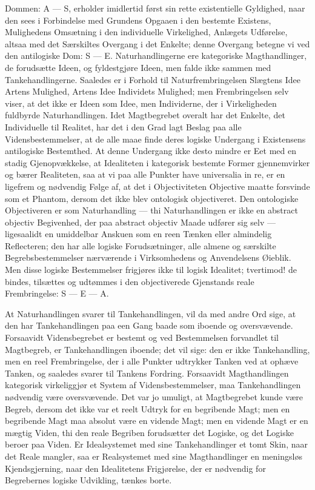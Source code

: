 \documentclass[12pt]{book}
\newcommand{\opage}[1]{\marginnote{\footnotesize\textit{[#1]}}}
\begin{document}
Dommen: A --- S, erholder imidlertid først sin rette existentielle Gyldighed, naar den sees i
Forbindelse med Grundens Opgaaen i den bestemte Existens, Mulighedens
\opage{222} Omsætning i den individuelle Virkelighed, Anlægets Udførelse, altsaa med det Særskiltes Overgang i
det Enkelte; denne Overgang betegne vi ved den antilogiske Dom: S --- E. Naturhandlingerne ere
kategoriske Magthandlinger, de forudsætte Ideen, og fyldestgjøre Ideen, men falde ikke sammen med
Tankehandlingerne. Saaledes er i Forhold til Naturfrembringelsen Slægtens Idee Artens Mulighed,
Artens Idee Individets Mulighed; men Frembringelsen selv viser, at det ikke er Ideen som Idee, men
Individerne, der i Virkeligheden fuldbyrde Naturhandlingen. Idet Magtbegrebet overalt har det
Enkelte, det Individuelle til Realitet, har det i den Grad lagt Beslag paa alle Vidensbestemmelser,
at de alle maae finde deres logiske Undergang i Existensens antilogiske Bestemthed. At denne
Undergang ikke desto mindre er Eet med en stadig Gjenopvækkelse, at Idealiteten i kategorisk
bestemte Former gjennemvirker og bærer Realiteten, saa at vi paa alle Punkter have universalia in
re, er en ligefrem og nødvendig Følge af, at det i Objectiviteten Objective maatte forsvinde som et
Phantom, dersom det ikke blev ontologisk objectiveret. Den ontologiske Objectiveren er som
Naturhandling --- thi Naturhandlingen er ikke en abstract objectiv Begivenhed, der paa abstract
objectiv Maade udfører sig selv --- ligesaalidt en umiddelbar Anskuen som en reen Tænken eller
almindelig Reflecteren; den har alle logiske Forudsætninger, alle almene og særskilte
Begrebsbestemmelser nærværende i Virksomhedens og Anvendelsens Øieblik. Men disse logiske
Bestemmelser frigjøres ikke til logisk Idealitet; tvertimod! de bindes, tilsættes og udtømmes i den
objectiverede Gjenstands reale Frembringelse: S --- E --- A.

At Naturhandlingen svarer til Tankehandlingen, vil da med andre Ord sige, at den har
Tankehandlingen paa een Gang baade som iboende og oversvævende. Forsaavidt Vidensbegrebet er bestemt
og ved Bestemmelsen forvandlet til Magtbegreb, er Tankehandlingen iboende; det vil sige: den er ikke
\opage{223} Tankehandling, men en reel Frembringelse, der i alle Punkter udtrykker Tanken ved at ophæve Tanken,
og saaledes svarer til Tankens Fordring. Forsaavidt Magthandlingen kategorisk virkeliggjør et System
af Vidensbestemmelser, maa Tankehandlingen nødvendig være oversvævende. Det var jo umuligt, at
Magtbegrebet kunde være Begreb, dersom det ikke var et reelt Udtryk for en begribende Magt; men en
begribende Magt maa absolut være en vidende Magt; men en vidende Magt er en mægtig Viden, thi den
reale Begriben forudsætter det Logiske, og det Logiske beroer paa Viden. Er Idealsystemet med sine
Tankehandlinger et tomt Skin, naar det Reale mangler, saa er Realsystemet med sine Magthandlinger en
meningsløs Kjendsgjerning, naar den Idealitetens Frigjørelse, der er nødvendig for Begrebernes
logiske Udvikling, tænkes borte.
\end{document}
